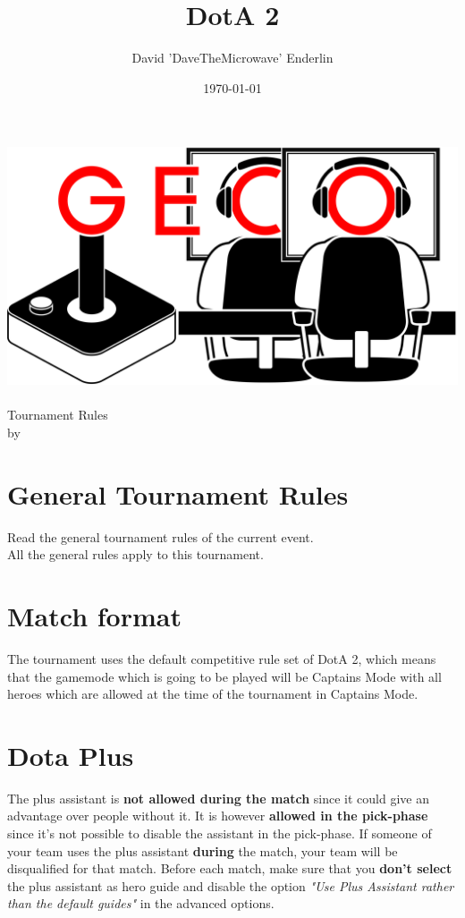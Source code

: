 \documentclass{article}
\title{DotA 2}
\author{David 'DaveTheMicrowave' Enderlin}
\date{\today}
\begin{document}
	
	\makeatletter
	\begin{titlepage}
		\centering
		\includegraphics[scale=0.075]{GECo.png}\\
		\LARGE \@title\\ Tournament Rules\\ \normalsize by \@author\\ \@date
	\end{titlepage}
	\makeatother
	
	\clearpage
	
	\tableofcontents
	\clearpage
	
	\section{General Tournament Rules}
	Read the general tournament rules of the current event.\\
	All the general rules apply to this tournament.
	
	\section{Match format}
	The tournament uses the default competitive rule set of DotA 2, which means that the gamemode which is going to be played will be Captains Mode with all heroes which are allowed at the time of the tournament in Captains Mode.
	
	\section{Dota Plus}
	The plus assistant is \textbf{not allowed during the match} since it could give an advantage over people without it. It is however \textbf{allowed in the pick-phase} since it's not possible to disable the assistant in the pick-phase. If someone of your team uses the plus assistant \textbf{during} the match, your team will be disqualified for that match. Before each match, make sure that you \textbf{don't select} the plus assistant as hero guide and disable the option \textit{"Use Plus Assistant rather than the default guides"} in the advanced options.
	
\end{document}
